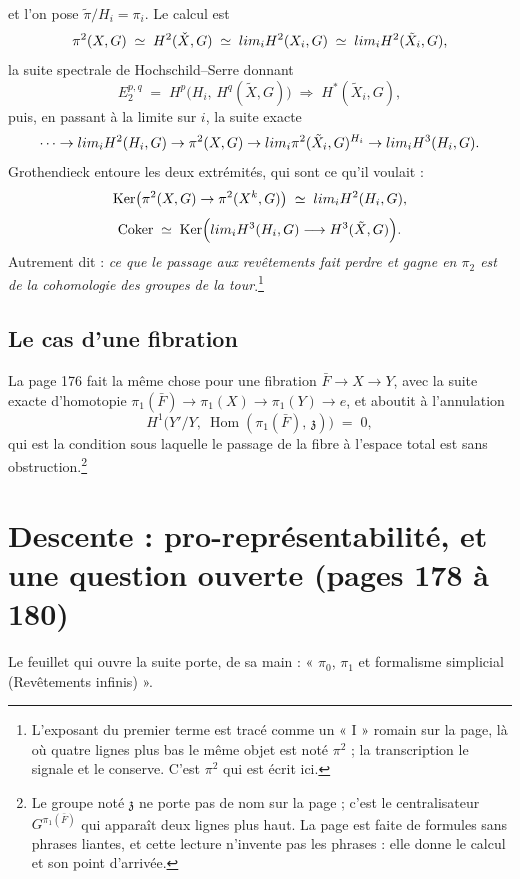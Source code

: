 \documentclass[11pt,a4paper]{article}
\begin{document}
et l'on pose $\tilde{\pi}/H_{i} = \pi_{i}$. Le calcul est
\[
  \pi^{2}(X, G) \;\simeq\; H^{2}(\check{X}, G) \;\simeq\;
  \varinjlim_{i} H^{2}(X_{i}, G) \;\simeq\;
  \varinjlim_{i} H^{2}(\tilde{X}_{i}, G) ,
\]
la suite spectrale de Hochschild--Serre donnant
\[
  E_{2}^{p,q} \;=\; H^{p}\bigl(H_{i},\, H^{q}(\tilde{X}, G)\bigr)
  \;\Longrightarrow\; H^{*}(\tilde{X}_{i}, G) ,
\]
puis, en passant à la limite sur $i$, la suite exacte
\[
  \cdots \to \varinjlim_{i} H^{2}(H_{i}, G) \to \pi^{2}(X, G) \to
  \varinjlim_{i} \pi^{2}(\tilde{X}_{i}, G)^{H_{i}} \to
  \varinjlim_{i} H^{3}(H_{i}, G) .
\]
Grothendieck entoure les deux extrémités, qui sont ce qu'il voulait :
\[
  \operatorname{Ker}\bigl(\pi^{2}(X,G) \to \pi^{2}(X^{k},G)\bigr) \;\simeq\;
  \varinjlim_{i} H^{2}(H_{i}, G) ,
\]
\[
  \operatorname{Coker} \;\simeq\;
  \operatorname{Ker}\Bigl(\varinjlim_{i} H^{3}(H_{i}, G) \longrightarrow
  H^{3}(\tilde{X}, G)\Bigr) .
\]
Autrement dit : \emph{ce que le passage aux revêtements fait perdre et gagne en
$\pi_{2}$ est de la cohomologie des groupes de la tour}.\footnote{L'exposant du
premier terme est tracé comme un « I » romain sur la page, là où quatre lignes
plus bas le même objet est noté $\pi^{2}$ ; la transcription le signale et le
conserve. C'est $\pi^{2}$ qui est écrit ici.}

\subsection*{Le cas d'une fibration}

La page 176 fait la même chose pour une fibration $\bar{F} \to X \to Y$, avec
la suite exacte d'homotopie $\pi_{1}(\bar{F}) \to \pi_{1}(X) \to \pi_{1}(Y)
\to e$, et aboutit à l'annulation
\[
  H^{1}\bigl(Y'/Y,\ \operatorname{Hom}(\pi_{1}(\bar{F}),\, \mathfrak{z})\bigr)
  \;=\; 0 ,
\]
qui est la condition sous laquelle le passage de la fibre à l'espace total est
sans obstruction.\footnote{Le groupe noté $\mathfrak{z}$ ne porte pas de nom
sur la page ; c'est le centralisateur $G^{\pi_{1}(\bar{F})}$ qui apparaît deux
lignes plus haut. La page est faite de formules sans phrases liantes, et cette
lecture n'invente pas les phrases : elle donne le calcul et son point
d'arrivée.}

\section*{Descente : pro-représentabilité, et une question ouverte (pages 178 à 180)}

Le feuillet qui ouvre la suite porte, de sa main : « $\pi_{0}$, $\pi_{1}$ et
formalisme simplicial (Revêtements infinis) ».
\end{document}
